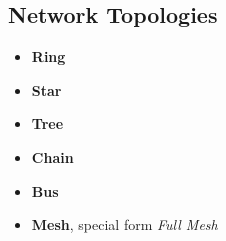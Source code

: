 \begin{refsection}
\subsection{Network Topologies}

\begin{itemize}
	\item \textbf{Ring}
	\item \textbf{Star}
	\item \textbf{Tree}
	\item \textbf{Chain}
	\item \textbf{Bus}
	\item \textbf{Mesh}, special form \emph{Full Mesh}
\end{itemize}

{}
\printbibliography[heading=subbibliography]
\end{refsection}

